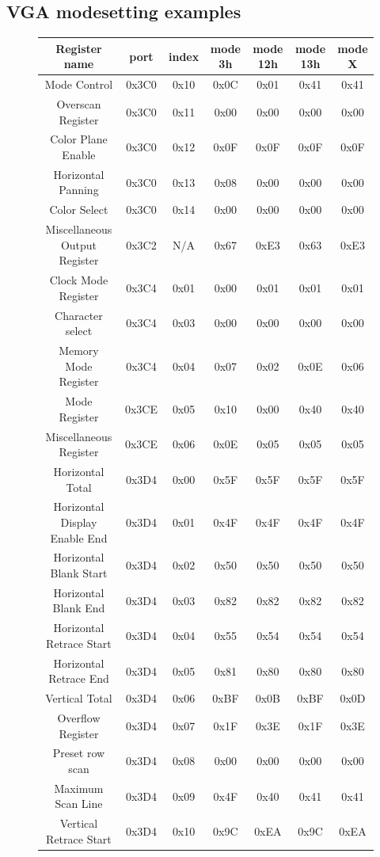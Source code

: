 \begin{appendices}
\section{VGA modesetting examples}
\label{appendix:c:4}
\begin{figure}[H]
\begin{tabular}{|c|c|c|c|c|c|c|}
\hline
Register name&port&index&mode 3h&mode 12h&mode 13h&mode X\\
\hline\hline
Mode Control&0x3C0&0x10&0x0C&0x01&0x41&0x41\\
\hline
Overscan Register&0x3C0&0x11&0x00&0x00&0x00&0x00\\
\hline
Color Plane Enable&0x3C0&0x12&0x0F&0x0F&0x0F&0x0F\\
\hline
Horizontal Panning&0x3C0&0x13&0x08&0x00&0x00&0x00\\
\hline
Color Select&0x3C0&0x14&0x00&0x00&0x00&0x00\\
\hline
Miscellaneous Output Register&0x3C2&N/A&0x67&0xE3&0x63&0xE3\\
\hline
Clock Mode Register&0x3C4&0x01&0x00&0x01&0x01&0x01\\
\hline
Character select&0x3C4&0x03&0x00&0x00&0x00&0x00\\
\hline
Memory Mode Register&0x3C4&0x04&0x07&0x02&0x0E&0x06\\
\hline
Mode Register&0x3CE&0x05&0x10&0x00&0x40&0x40\\
\hline
Miscellaneous Register&0x3CE&0x06&0x0E&0x05&0x05&0x05\\
\hline
Horizontal Total&0x3D4&0x00&0x5F&0x5F&0x5F&0x5F\\
\hline
Horizontal Display Enable End&0x3D4&0x01&0x4F&0x4F&0x4F&0x4F\\
\hline
Horizontal Blank Start&0x3D4&0x02&0x50&0x50&0x50&0x50\\
\hline
Horizontal Blank End&0x3D4&0x03&0x82&0x82&0x82&0x82\\
\hline
Horizontal Retrace Start&0x3D4&0x04&0x55&0x54&0x54&0x54\\
\hline
Horizontal Retrace End&0x3D4&0x05&0x81&0x80&0x80&0x80\\
\hline
Vertical Total&0x3D4&0x06&0xBF&0x0B&0xBF&0x0D\\
\hline
Overflow Register&0x3D4&0x07&0x1F&0x3E&0x1F&0x3E\\
\hline
Preset row scan&0x3D4&0x08&0x00&0x00&0x00&0x00\\
\hline
Maximum Scan Line&0x3D4&0x09&0x4F&0x40&0x41&0x41\\
\hline
Vertical Retrace Start&0x3D4&0x10&0x9C&0xEA&0x9C&0xEA\\

\end{tabular}
\end{figure}
\end{appendices}
